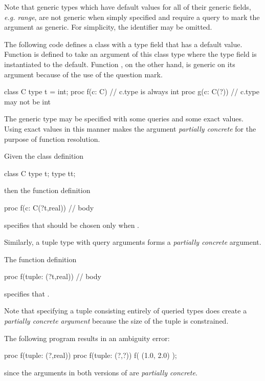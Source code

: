 Note that generic types which have default values for all of their
generic fields, \emph{e.g. range}, are not generic when simply
specified and require a query to mark the argument as generic.  For
simplicity, the identifier may be omitted.
\begin{example}
The following code defines a class with a type field that has a
default value.  Function  is defined to take an argument of
this class type where the type field is instantiated to the default.
Function , on the other hand, is generic on its argument
because of the use of the question mark.
\begin{chapel}
class C {
  type t = int;
}
proc f(c: C) {
  // c.type is always int
}
proc g(c: C(?)) {
  // c.type may not be int
}
\end{chapel}
\end{example}

The generic type may be specified with some queries and some exact
values.  Using exact values in this manner makes the argument
\emph{partially concrete} for the purpose of function resolution.
\begin{example}
Given the class definition
\begin{chapel}
class C {
  type t;
  type tt;
}
\end{chapel}
then the function definition
\begin{chapel}
proc f(c: C(?t,real)) {
  // body
}
\end{chapel}
specifies that  should be chosen only when .
\end{example}
Similarly, a tuple type with query arguments
forms a \emph{partially concrete} argument.
\begin{example}
The function definition
\begin{chapel}
proc f(tuple: (?t,real)) {
  // body
}
\end{chapel}
specifies that .
\end{example}
Note that specifying a tuple consisting entirely of queried types
does create a \emph{partially concrete argument} because the size
of the tuple is constrained.
\begin{example}
The following program results in an ambiguity error:
\begin{chapel}
proc f(tuple: (?,real)) {
}
proc f(tuple: (?,?)) {
}
f( (1.0, 2.0) );
\end{chapel}
since the  arguments in both versions of  are
\emph{partially concrete}.
\end{example}


